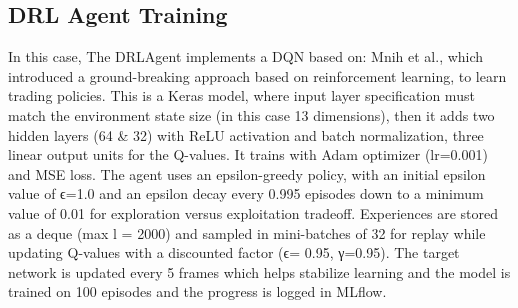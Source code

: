 \subsection{DRL Agent Training}

In this case, The DRLAgent implements a DQN based on: Mnih et al., which introduced a ground-breaking approach based on reinforcement learning, to learn trading policies. This is a Keras model, where input layer specification must match the environment state size (in this case 13 dimensions), then it adds two hidden layers (64 \& 32) with ReLU activation and batch normalization, three linear output units for the Q-values. It trains with Adam optimizer (lr=0.001) and MSE loss. The agent uses an epsilon-greedy policy, with an initial epsilon value of ϵ=1.0 and an epsilon decay every 0.995 episodes down to a minimum value of 0.01 for exploration versus exploitation tradeoff. Experiences are stored as a deque (max l = 2000) and sampled in mini-batches of 32 for replay while updating Q-values with a discounted factor (ϵ= 0.95, γ=0.95). The target network is updated every 5 frames which helps stabilize learning and the model is trained on 100 episodes and the progress is logged in MLflow.


